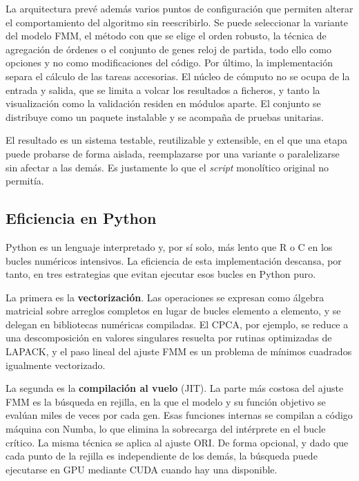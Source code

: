 \documentclass[12pt, a4paper]{report}
\begin{document}
La arquitectura prevé además varios puntos de configuración que permiten alterar el comportamiento del algoritmo sin reescribirlo. Se puede seleccionar la variante del modelo FMM, el método con que se elige el orden robusto, la técnica de agregación de órdenes o el conjunto de genes reloj de partida, todo ello como opciones y no como modificaciones del código. Por último, la implementación separa el cálculo de las tareas accesorias. El núcleo de cómputo no se ocupa de la entrada y salida, que se limita a volcar los resultados a ficheros, y tanto la visualización como la validación residen en módulos aparte. El conjunto se distribuye como un paquete instalable y se acompaña de pruebas unitarias.

El resultado es un sistema testable, reutilizable y extensible, en el que una etapa puede probarse de forma aislada, reemplazarse por una variante o paralelizarse sin afectar a las demás. Es justamente lo que el \textit{script} monolítico original no permitía.

\subsection{Eficiencia en Python}
\label{subsec:eficiencia}

Python es un lenguaje interpretado y, por sí solo, más lento que R o C en los bucles numéricos intensivos. La eficiencia de esta implementación descansa, por tanto, en tres estrategias que evitan ejecutar esos bucles en Python puro.

La primera es la \textbf{vectorización}. Las operaciones se expresan como álgebra matricial sobre arreglos completos en lugar de bucles elemento a elemento, y se delegan en bibliotecas numéricas compiladas. El CPCA, por ejemplo, se reduce a una descomposición en valores singulares resuelta por rutinas optimizadas de LAPACK, y el paso lineal del ajuste FMM es un problema de mínimos cuadrados igualmente vectorizado.

La segunda es la \textbf{compilación al vuelo} (JIT). La parte más costosa del ajuste FMM es la búsqueda en rejilla, en la que el modelo y su función objetivo se evalúan miles de veces por cada gen. Esas funciones internas se compilan a código máquina con Numba, lo que elimina la sobrecarga del intérprete en el bucle crítico. La misma técnica se aplica al ajuste ORI. De forma opcional, y dado que cada punto de la rejilla es independiente de los demás, la búsqueda puede ejecutarse en GPU mediante CUDA cuando hay una disponible.
\end{document}
